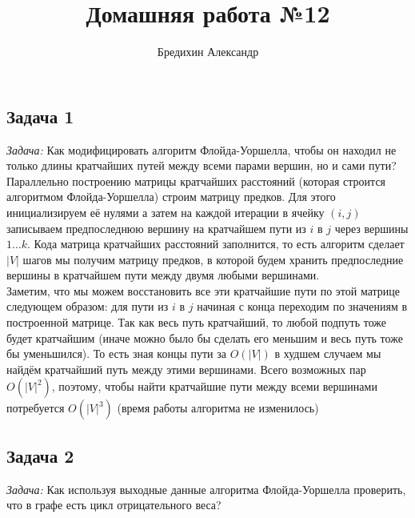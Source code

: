 \documentclass[a4paper,12pt]{article} %
\author{Бредихин Александр}
\title{Домашняя работа №12}
\begin{document}
\maketitle

\subsection*{Задача 1}
\textit{Задача:} Как модифицировать алгоритм Флойда-Уоршелла, чтобы он находил не только длины кратчайших путей между всеми парами вершин, но и сами пути?\\

Параллельно построению матрицы кратчайших расстояний (которая строится алгоритмом Флойда-Уоршелла) строим матрицу предков. Для этого инициализируем её нулями а затем на каждой итерации в ячейку $ (i,j) $ записываем предпоследнюю вершину на кратчайшем пути из $ i $ в $ j $ через вершины $1 \ldots k $. Кода матрица кратчайших расстояний заполнится, то есть алгоритм сделает $ |V| $ шагов мы получим матрицу предков, в которой будем хранить предпоследние вершины в кратчайшем пути между двумя любыми вершинами.\\

Заметим, что мы можем восстановить все эти кратчайшие пути по этой матрице следующем образом: для пути из $ i $ в $ j $ начиная с конца переходим по значениям в построенной матрице. Так как весь путь кратчайший, то любой подпуть тоже будет кратчайшим (иначе можно было бы сделать его меньшим и весь путь тоже бы уменьшился). То есть зная концы пути за $ O(|V|) $ в худшем случаем мы найдём кратчайший путь между этими вершинами. Всего возможных пар $ O(|V|^2) $, поэтому, чтобы найти кратчайшие пути между всеми вершинами потребуется $ O(|V|^3) $ (время работы алгоритма не изменилось)

\subsection*{Задача 2}
\textit{Задача:} Как используя выходные данные алгоритма Флойда-Уоршелла проверить, что в графе есть цикл отрицательного веса?\\
\end{document}
